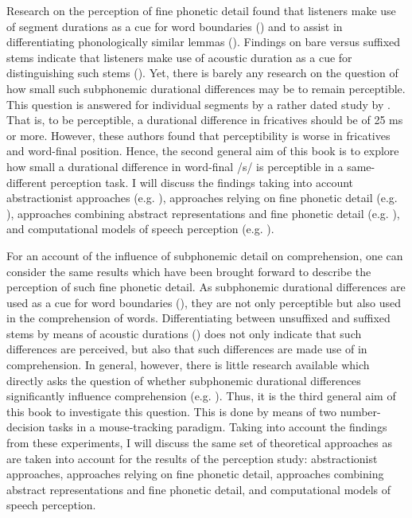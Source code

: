 Research on the perception of fine phonetic detail found that listeners make use of segment durations as a cue for word boundaries (\cite{Shatzman2006}) and to assist in differentiating phonologically similar lemmas (\cite{Warner2004}). Findings on bare versus suffixed stems indicate that listeners make use of acoustic duration as a cue for distinguishing such stems (\cite{Kemps2005a, Kemps2005b, Blazej2015}). Yet, there is barely any research on the question of how small such subphonemic durational differences may be to remain perceptible. This question is answered for individual segments by a rather dated study by \citet{Klatt1975}. That is, to be perceptible, a durational difference in fricatives should be of 25 ms or more. However, these authors found that perceptibility is worse in fricatives and word-final position. Hence, the second general aim of this book is to explore how small a durational difference in word-final /s/ is perceptible in a same-different perception task. I will discuss the findings taking into account abstractionist approaches (e.g. \cite{Klatt1979, McClelland1986, Norris1994, Norris2008}), approaches relying on fine phonetic detail (e.g. \cite{Goldinger1996}), approaches combining abstract representations and fine phonetic detail (e.g. \cite{Hawkins2001, Pierrehumbert2002}), and computational models of speech perception (e.g. \cite{tenBosch2015, Baayen2019}).

For an account of the influence of subphonemic detail on comprehension, one can consider the same results which have been brought forward to describe the perception of such fine phonetic detail. As subphonemic durational differences are used as a cue for word boundaries (\cite{Shatzman2006}), they are not only perceptible but also used in the comprehension of words. Differentiating between unsuffixed and suffixed stems by means of acoustic durations (\cite{Kemps2005a, Kemps2005b, Blazej2015}) does not only indicate that such differences are perceived, but also that such differences are made use of in comprehension. In general, however, there is little research available which directly asks the question of whether subphonemic durational differences significantly influence comprehension (e.g. \cite{Blazej2015}). Thus, it is the third general aim of this book to investigate this question. This is done by means of two number-decision tasks in a mouse-tracking paradigm. Taking into account the findings from these experiments, I will discuss the same set of theoretical approaches as are taken into account for the results of the perception study: abstractionist approaches, approaches relying on fine phonetic detail, approaches combining abstract representations and fine phonetic detail, and computational models of speech perception. 

